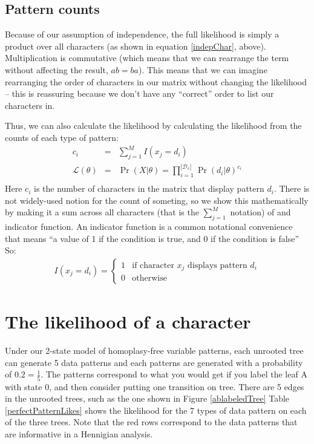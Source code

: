 \documentclass[11pt]{article}
\newcommand{\variablePatternSpace}{\ensuremath{\mathcal{D}_v}}
\begin{document}
\subsection*{Pattern counts}
Because of our assumption of independence, the full likelihood is simply
a product over all characters (as shown in equation \ref{indepChar}, above).
Multiplication is commutative (which means that we can rearrange the term without affecting the result, $ab=ba$).
This means that we can imagine rearranging the order of characters in our matrix without
changing the likelihood -- this is reassuring because we don't have any ``correct'' order
to list our characters in.

Thus, we can also calculate the likelihood by calculating the likelihood from the counts of each type of pattern:
\begin{eqnarray}\label{prodOverPatterns}
	c_i & = & \sum_{j=1}^{M}I(x_j = d_i) \\
	\mathcal{L}(\theta) & = & \Pr(X|\theta) =  \prod_{i=1}^{|\variablePatternSpace|}\Pr(d_i|\theta)^{c_i} \\
\end{eqnarray}
Here $c_i$ is the number of characters in the matrix that display pattern $d_i$.  
There is not widely-used notion for the count of someting, so we show this mathematically
by making it a sum across all characters (that is the $\sum_{j=1}^{M}$ notation) of and indicator function.
An indicator function is a common notational convenience that means ``a value of 1 if the condition is true, and 0 if the condition is false'' So:
\begin{eqnarray}
	I(x_j = d_i) = \left\{ \begin{array}{cc}
1  &  \mbox{if character } x_j \mbox{ displays pattern } d_i   \\
0 & \mbox{otherwise}   
\end{array} \right.
\end{eqnarray}

\section*{The likelihood of a character}
Under our 2-state  model of homoplasy-free variable patterns, each unrooted tree can generate 5 data patterns and each patterns are generated with a probability of $0.2 = \frac{1}{5}$. The patterns correspond to what you would get if you label the leaf A with state 0, and then consider putting one transition on tree.
There are 5 edges in the unrooted trees, such as the one shown in Figure \ref{ablabeledTree}
Table \ref{perfectPatternLikes} shows the likelihood for the 7 types of data pattern on each of the three trees.
Note that the red rows correspond to the data patterns that are informative in a Hennigian analysis.
\end{document}
